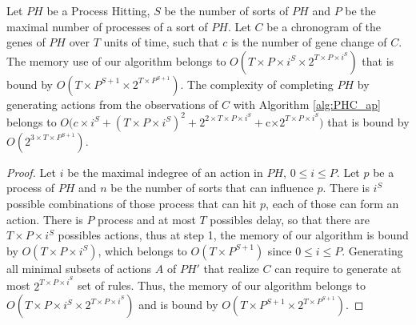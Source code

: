 \begin{theorem}[Complexity]
	\label{th:complexity}
	Let $PH$ be a Process Hitting, $S$ be the number of sorts of $PH$ and $P$ be the maximal number of processes of a sort of $PH$.
	Let $C$ be a chronogram of the genes of $PH$ over $T$ units of time, such that $c$ is the number of gene change of $C$.
	The memory use of our algorithm belongs to $O(T \times  P \times  i^S \times  2^{T\times  P \times  i^S})$ that is bound by $O(T \times  P^{S+1} \times  2^{T\times  P^{S+1}})$.
	The complexity of completing $PH$ by generating actions from the observations of $C$ with Algorithm \ref{alg:PHC_ap} belongs to
	$O(c\times i^S + (T\times P\times i^S)^2 + 2^{2\times T\times  P \times  i^S} + $c$ \times  2^{T\times  P \times  i^S})$ that is bound by $O(2^{3\times T\times P^{S+1}})$.
	\begin{proof}
		Let $i$ be the maximal indegree of an action in $PH$, $0 \leq i \leq P$.
		Let $p$ be a process of $PH$ and $n$ be the number of sorts that can influence $p$.
		There is $i^S$ possible combinations of those process that can hit $p$, each of those can form an action.
		There is $P$ process and at most $T$ possibles delay, so that there are $T\times  P \times  i^S$ possibles actions,
		thus at step 1, the memory of our algorithm is bound by $O(T \times  P \times  i^S)$,
		which belongs to $O(T\times P^{S+1})$ since $0 \leq i \leq P$.
		Generating all minimal subsets of actions $A$ of $PH'$ that realize $C$ can require to generate at most $2^{T\times  P \times  i^S}$ set of rules.
		Thus, the memory of our algorithm belongs to $O(T \times  P \times  i^S \times  2^{T\times  P \times  i^S})$ and is bound by $O(T \times  P^{S+1} \times  2^{T\times  P^{S+1}})$.
		

\end{proof}
\end{theorem}
